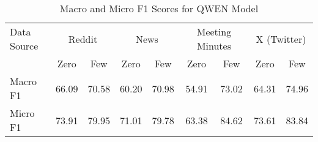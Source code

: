 \begin{table}[htbp]
\centering
\begin{tabular}{l *{8}{c}}
\toprule
Data Source & \multicolumn{2}{c}{Reddit} & \multicolumn{2}{c}{News} & \multicolumn{2}{c}{Meeting Minutes} & \multicolumn{2}{c}{X (Twitter)} \\
& Zero & Few & Zero & Few & Zero & Few & Zero & Few \\
\midrule
Macro F1 & 66.09 & 70.58 & 60.20 & 70.98 & 54.91 & 73.02 & 64.31 & 74.96 \\
Micro F1 & 73.91 & 79.95 & 71.01 & 79.78 & 63.38 & 84.62 & 73.61 & 83.84 \\
\bottomrule
\end{tabular}
\centering\caption{Macro and Micro F1 Scores for QWEN Model}
\label{tab:qwen_macro_micro}
\end{table}